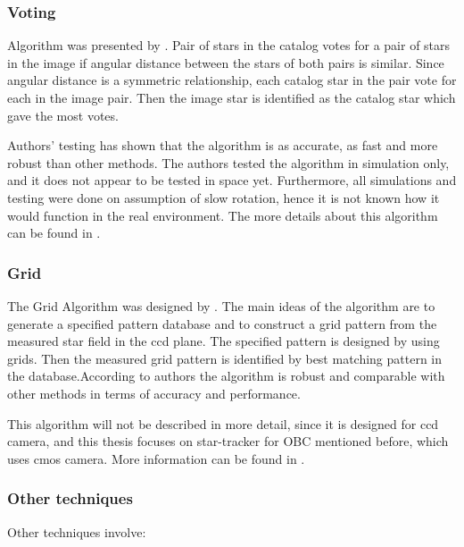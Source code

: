 \documentclass[12pt,a4paper,twoside]{article}
\begin{document}
\subsubsection{Voting}
Algorithm was presented by \citet{kolomenkin2008geometric}. Pair of stars in the catalog votes for a pair of stars in the image if angular distance between the stars of both pairs is similar. Since angular distance is a symmetric relationship, each catalog star in the pair vote for each in the image pair. Then the image star is identified as the catalog star which gave the most votes.

Authors' testing has shown that the algorithm is as accurate, as fast and more robust than other methods. The authors tested the algorithm in simulation only, and it does not appear to be tested in space yet. Furthermore, all simulations and testing were done on assumption of slow rotation, hence it is not known how it would function in the real environment. The more details about this algorithm can be found in \citet{kolomenkin2008geometric}.


\subsubsection{Grid}
The Grid Algorithm was designed by \citet{padgett1997grid}. The main ideas of the algorithm are to generate a specified pattern database and to construct a grid pattern from the measured star field in the \gls{ccd} plane. The specified pattern is designed by using grids. Then the measured grid pattern is identified by best matching pattern in the database.According to authors the algorithm is robust and comparable with other methods in terms of accuracy and performance.

This algorithm will not be described in more detail, since it is designed for \gls{ccd} camera, and this thesis focuses on star-tracker for OBC mentioned before, which uses \gls{cmos} camera. More information can be found in \citet{padgett1997grid}.


\subsubsection{Other techniques}

Other techniques involve: 
\end{document}
